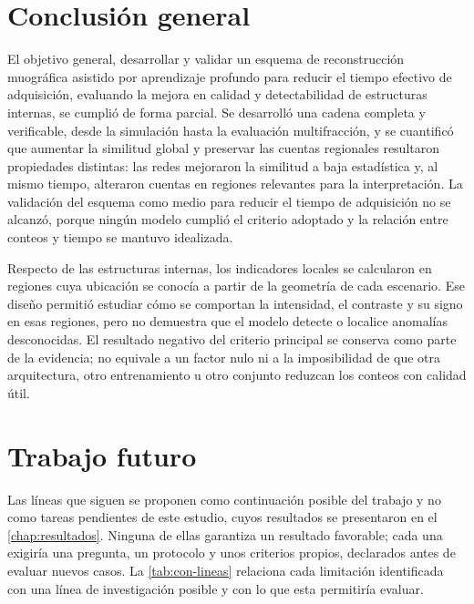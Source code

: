 \section{Conclusión general}
\label{sec:conc-general}

El objetivo general, desarrollar y validar un esquema de reconstrucción muográfica asistido por aprendizaje profundo para reducir el tiempo efectivo de adquisición, evaluando la mejora en calidad y detectabilidad de estructuras internas, se cumplió de forma parcial. Se desarrolló una cadena completa y verificable, desde la simulación hasta la evaluación multifracción, y se cuantificó que aumentar la similitud global y preservar las cuentas regionales resultaron propiedades distintas: las redes mejoraron la similitud a baja estadística y, al mismo tiempo, alteraron cuentas en regiones relevantes para la interpretación. La validación del esquema como medio para reducir el tiempo de adquisición no se alcanzó, porque ningún modelo cumplió el criterio adoptado y la relación entre conteos y tiempo se mantuvo idealizada.

Respecto de las estructuras internas, los indicadores locales se calcularon en regiones cuya ubicación se conocía a partir de la geometría de cada escenario. Ese diseño permitió estudiar cómo se comportan la intensidad, el contraste y su signo en esas regiones, pero no demuestra que el modelo detecte o localice anomalías desconocidas. El resultado negativo del criterio principal se conserva como parte de la evidencia; no equivale a un factor nulo ni a la imposibilidad de que otra arquitectura, otro entrenamiento u otro conjunto reduzcan los conteos con calidad útil.

\section{Trabajo futuro}
\label{sec:trabajo-futuro}

Las líneas que siguen se proponen como continuación posible del trabajo y no como tareas pendientes de este estudio, cuyos resultados se presentaron en el \cref{chap:resultados}. Ninguna de ellas garantiza un resultado favorable; cada una exigiría una pregunta, un protocolo y unos criterios propios, declarados antes de evaluar nuevos casos. La \cref{tab:con-lineas} relaciona cada limitación identificada con una línea de investigación posible y con lo que esta permitiría evaluar.

